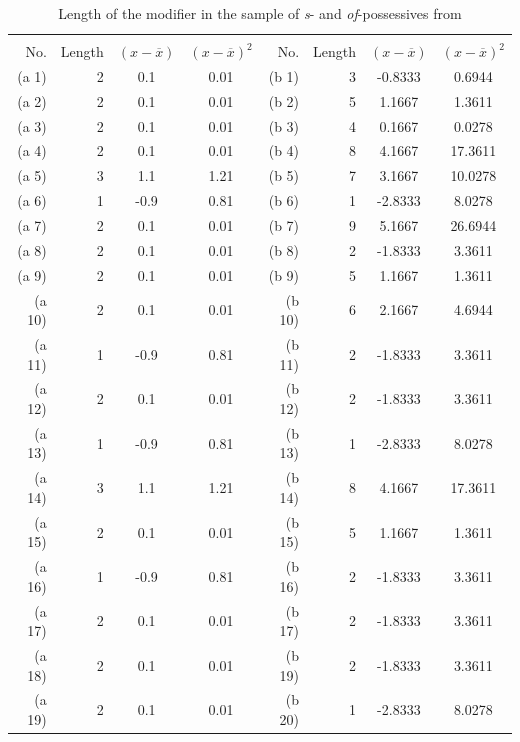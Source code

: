 \begin{table}
\caption{Length of the modifier in the sample of \textit{s}- and \textit{of}-possessives from }
\label{tab:posslengthwelch}
\begin{tabular}[t]{rrS[table-format=-1.1]c@{\hspace{4\tabcolsep}}rrS[table-format=-1.4]S[table-format=2.4]}
\lsptoprule
{} &   \\\cmidrule(lr){1-4}\cmidrule(lr){5-8}
      {No.}
	& {Length}
	& {$(x-\overline{x})$}
	& {$(x-\overline{x})^2$}
	& {No.}
	& {Length}
	& {$(x-\overline{x})$}
	& {$(x-\overline{x})^2$}
\\
\midrule
(a 1) & 2 & 0.1 & 0.01 & (b 1) & 3 & -0.8333 & 0.6944 \\
(a 2) & 2 & 0.1 & 0.01 & (b 2) & 5 & 1.1667 & 1.3611 \\
(a 3) & 2 & 0.1 & 0.01 & (b 3) & 4 & 0.1667 & 0.0278 \\
(a 4) & 2 & 0.1 & 0.01 & (b 4) & 8 & 4.1667 & 17.3611 \\
(a 5) & 3 & 1.1 & 1.21 & (b 5) & 7 & 3.1667 & 10.0278 \\
(a 6) & 1 & -0.9 & 0.81 & (b 6) & 1 & -2.8333 & 8.0278 \\
(a 7) & 2 & 0.1 & 0.01 & (b 7) & 9 & 5.1667 & 26.6944 \\
(a 8) & 2 & 0.1 & 0.01 & (b 8) & 2 & -1.8333 & 3.3611 \\
(a 9) & 2 & 0.1 & 0.01 & (b 9) & 5 & 1.1667 & 1.3611 \\
(a 10) & 2 & 0.1 & 0.01  &(b 10) & 6 & 2.1667 & 4.6944 \\
(a 11) & 1 & -0.9 & 0.81 & (b 11) & 2 & -1.8333 & 3.3611 \\
(a 12) & 2 & 0.1 & 0.01  &(b 12) & 2 & -1.8333 & 3.3611 \\
(a 13) & 1 & -0.9 & 0.81 & (b 13) & 1 & -2.8333 & 8.0278 \\
(a 14) & 3 & 1.1 & 1.21 & (b 14) & 8 & 4.1667 & 17.3611 \\
(a 15) & 2 & 0.1 & 0.01 & (b 15) & 5 & 1.1667 & 1.3611 \\
(a 16) & 1 & -0.9 & 0.81 & (b 16) & 2 & -1.8333 & 3.3611 \\
(a 17) & 2 & 0.1 & 0.01 & (b 17) & 2 & -1.8333 & 3.3611 \\
(a 18) & 2 & 0.1 & 0.01 & (b 19) & 2 & -1.8333 & 3.3611 \\
(a 19) & 2 & 0.1 & 0.01 & (b 20) & 1 & -2.8333 & 8.0278 \\

\end{tabular}
\end{table}
